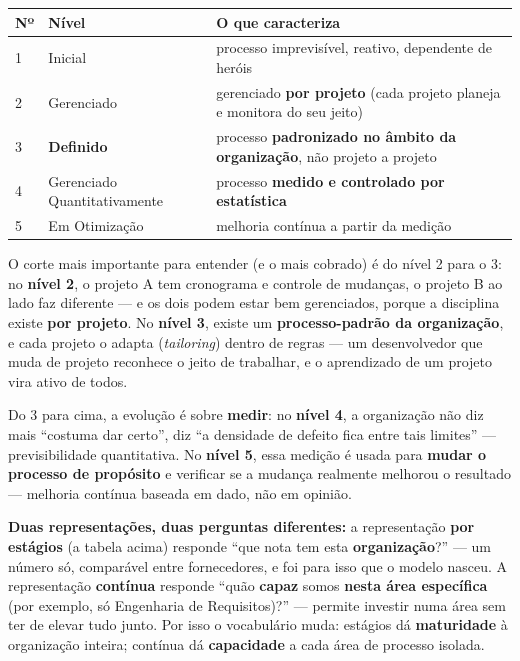 \begin{conceito}
\begin{center}
\begin{tabular}{@{}p{1cm}p{3.6cm}p{7.2cm}@{}}
\toprule
\textbf{Nº} & \textbf{Nível} & \textbf{O que caracteriza} \\
\midrule
1 & Inicial & processo imprevisível, reativo, dependente de heróis \\
2 & Gerenciado & gerenciado \textbf{por projeto} (cada projeto planeja e
monitora do seu jeito) \\
3 & \textbf{Definido} & processo \textbf{padronizado no âmbito da
organização}, não projeto a projeto \\
4 & Gerenciado Quantitativamente & processo \textbf{medido e controlado por
estatística} \\
5 & Em Otimização & melhoria contínua a partir da medição \\
\bottomrule
\end{tabular}
\end{center}

O corte mais importante para entender (e o mais cobrado) é do nível 2 para
o 3: no \textbf{nível 2}, o projeto A tem cronograma e controle de mudanças,
o projeto B ao lado faz diferente --- e os dois podem estar bem gerenciados,
porque a disciplina existe \textbf{por projeto}. No \textbf{nível 3}, existe
um \textbf{processo-padrão da organização}, e cada projeto o adapta
(\textit{tailoring}) dentro de regras --- um desenvolvedor que muda de
projeto reconhece o jeito de trabalhar, e o aprendizado de um projeto vira
ativo de todos.

Do 3 para cima, a evolução é sobre \textbf{medir}: no \textbf{nível 4}, a
organização não diz mais “costuma dar certo”, diz “a densidade de defeito
fica entre tais limites” --- previsibilidade quantitativa. No \textbf{nível
5}, essa medição é usada para \textbf{mudar o processo de propósito} e
verificar se a mudança realmente melhorou o resultado --- melhoria contínua
baseada em dado, não em opinião.

\textbf{Duas representações, duas perguntas diferentes:} a representação
\textbf{por estágios} (a tabela acima) responde “que nota tem esta
\textbf{organização}?” --- um número só, comparável entre fornecedores, e
foi para isso que o modelo nasceu. A representação \textbf{contínua}
responde “quão \textbf{capaz} somos \textbf{nesta área específica}
(por exemplo, só Engenharia de Requisitos)?” --- permite investir numa área
sem ter de elevar tudo junto. Por isso o vocabulário muda: estágios dá
\textbf{maturidade} à organização inteira; contínua dá \textbf{capacidade} a
cada área de processo isolada.
\end{conceito}

